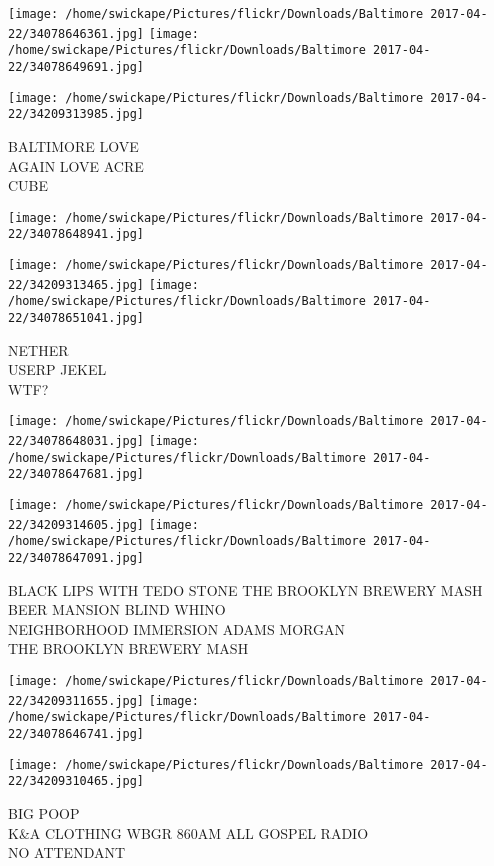 \documentclass[10pt,letterpaper]{article}
\begin{document}
\texttt{[image: /home/swickape/Pictures/flickr/Downloads/Baltimore 2017-04-22/34078646361.jpg]}
\texttt{[image: /home/swickape/Pictures/flickr/Downloads/Baltimore 2017-04-22/34078649691.jpg]}

\texttt{[image: /home/swickape/Pictures/flickr/Downloads/Baltimore 2017-04-22/34209313985.jpg]}

BALTIMORE LOVE\\
AGAIN LOVE ACRE\\
CUBE
\pagebreak

\texttt{[image: /home/swickape/Pictures/flickr/Downloads/Baltimore 2017-04-22/34078648941.jpg]}

\vspace{0.25in}
\texttt{[image: /home/swickape/Pictures/flickr/Downloads/Baltimore 2017-04-22/34209313465.jpg]}
\texttt{[image: /home/swickape/Pictures/flickr/Downloads/Baltimore 2017-04-22/34078651041.jpg]}

NETHER\\
USERP JEKEL\\
WTF?
\pagebreak

\texttt{[image: /home/swickape/Pictures/flickr/Downloads/Baltimore 2017-04-22/34078648031.jpg]}
\texttt{[image: /home/swickape/Pictures/flickr/Downloads/Baltimore 2017-04-22/34078647681.jpg]}

\texttt{[image: /home/swickape/Pictures/flickr/Downloads/Baltimore 2017-04-22/34209314605.jpg]}
\texttt{[image: /home/swickape/Pictures/flickr/Downloads/Baltimore 2017-04-22/34078647091.jpg]}

BLACK LIPS WITH TEDO STONE THE BROOKLYN BREWERY MASH\\
BEER MANSION BLIND WHINO\\
NEIGHBORHOOD IMMERSION ADAMS MORGAN\\
THE BROOKLYN BREWERY MASH
\pagebreak

\texttt{[image: /home/swickape/Pictures/flickr/Downloads/Baltimore 2017-04-22/34209311655.jpg]}
\texttt{[image: /home/swickape/Pictures/flickr/Downloads/Baltimore 2017-04-22/34078646741.jpg]}

\texttt{[image: /home/swickape/Pictures/flickr/Downloads/Baltimore 2017-04-22/34209310465.jpg]}

BIG POOP\\
K\&A CLOTHING WBGR 860AM ALL GOSPEL RADIO\\
NO ATTENDANT
\pagebreak
\end{document}
